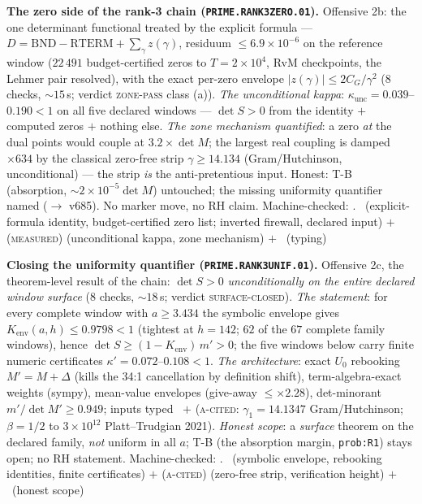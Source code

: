\par\smallskip\noindent\textbf{The zero side of the rank-3 chain
(\texttt{PRIME.RANK3ZERO.01}).}
Offensive 2b: the one determinant functional treated by the explicit
formula --- $D=\mathrm{BND}-\mathrm{RTERM}+\sum_\gamma z(\gamma)$,
residuum $\le6.9\times10^{-6}$ on the reference window ($22\,491$
budget-certified zeros to $T=2\times10^{4}$, RvM checkpoints, the
Lehmer pair resolved), with the exact per-zero envelope
$|z(\gamma)|\le2C_G/\gamma^2$ ($8$ checks, ${\sim}15$\,s; verdict
\textsc{zone-pass} class (a)).  \emph{The unconditional kappa}:
$\kappa_{\mathrm{unc}}=0.039$--$0.190<1$ on all five declared
windows --- $\det S>0$ from the identity $+$ computed zeros $+$
nothing else.  \emph{The zone mechanism quantified}: a zero
\emph{at} the dual points would couple at $3.2\times\det M$; the
largest real coupling is damped $\times634$ by the classical
zero-free strip $\gamma\ge14.134$ (Gram/Hutchinson, unconditional)
--- the strip \emph{is} the anti-pretentious input.  Honest: T-B
(absorption, $\sim2\times10^{-5}\det M$) untouched; the missing
uniformity quantifier named ($\to$ v685).  No marker move, no RH
claim.
Machine-checked: .
\mE\ (explicit-formula identity, budget-certified zero list;
inverted firewall, declared input) $+$ (\textsc{measured})
(unconditional kappa, zone mechanism) $+$ \mC\ (typing)
\par\smallskip


\par\smallskip\noindent\textbf{Closing the uniformity quantifier
(\texttt{PRIME.RANK3UNIF.01}).}
Offensive 2c, the theorem-level result of the chain: $\det S>0$
\emph{unconditionally on the entire declared window surface} ($8$
checks, ${\sim}18$\,s; verdict \textsc{surface-closed}).  \emph{The
statement}: for every complete window with $a\ge3.434$ the symbolic
envelope gives $K_{\mathrm{env}}(a,h)\le0.9798<1$ (tightest at
$h=142$; $62$ of the $67$ complete family windows), hence $\det
S\ge(1-K_{\mathrm{env}})\,m'>0$; the five windows below carry finite
numeric certificates $\kappa'=0.072$--$0.108<1$.  \emph{The
architecture}: exact $U_0$ rebooking $M'=M+\Delta$ (kills the 34:1
cancellation by definition shift), term-algebra-exact weights
(sympy), mean-value envelopes (give-away $\le\times2.28$),
det-minorant $m'/\det M'\ge0.949$; inputs typed \mE\ $+$
(\textsc{a-cited}: $\gamma_1=14.1347$ Gram/Hutchinson; $\beta=1/2$
to $3\times10^{12}$ Platt--Trudgian 2021).  \emph{Honest scope}: a
\emph{surface} theorem on the declared family, \emph{not} uniform in
all $a$; T-B (the absorption margin, \texttt{prob:R1}) stays open;
no RH statement.
Machine-checked: .
\mE\ (symbolic envelope, rebooking identities, finite certificates)
$+$ (\textsc{a-cited}) (zero-free strip, verification height) $+$
\mC\ (honest scope)
\par\smallskip


